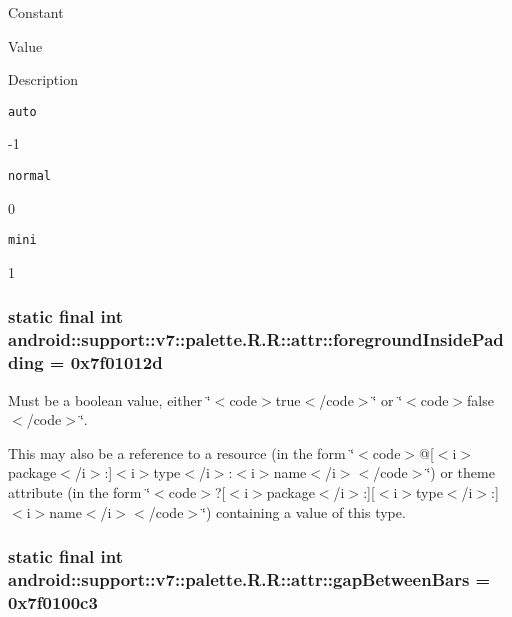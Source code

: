 Constant

Value

Description 

{\tt auto}

-1

{\tt normal}

0

{\tt mini}

1\hypertarget{classandroid_1_1support_1_1v7_1_1palette_1_1_r_1_1attr_0d2b5b2bbfdf52e3bba66cb3814cce50}{
\subsubsection[{foregroundInsidePadding}]{\setlength{\rightskip}{0pt plus 5cm}static final int android::support::v7::palette.R.R::attr::foregroundInsidePadding = 0x7f01012d}}
\label{classandroid_1_1support_1_1v7_1_1palette_1_1_r_1_1attr_0d2b5b2bbfdf52e3bba66cb3814cce50}


Must be a boolean value, either \char`\"{}$<$code$>$true$<$/code$>$\char`\"{} or \char`\"{}$<$code$>$false$<$/code$>$\char`\"{}. 

This may also be a reference to a resource (in the form \char`\"{}$<$code$>$@\mbox{[}$<$i$>$package$<$/i$>$:\mbox{]}$<$i$>$type$<$/i$>$:$<$i$>$name$<$/i$>$$<$/code$>$\char`\"{}) or theme attribute (in the form \char`\"{}$<$code$>$?\mbox{[}$<$i$>$package$<$/i$>$:\mbox{]}\mbox{[}$<$i$>$type$<$/i$>$:\mbox{]}$<$i$>$name$<$/i$>$$<$/code$>$\char`\"{}) containing a value of this type. \hypertarget{classandroid_1_1support_1_1v7_1_1palette_1_1_r_1_1attr_35cc0ed304ab03677caf6c8e384f2509}{
\subsubsection[{gapBetweenBars}]{\setlength{\rightskip}{0pt plus 5cm}static final int android::support::v7::palette.R.R::attr::gapBetweenBars = 0x7f0100c3}}
\label{classandroid_1_1support_1_1v7_1_1palette_1_1_r_1_1attr_35cc0ed304ab03677caf6c8e384f2509}



